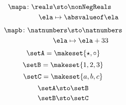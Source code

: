 {\begin{forslides}
        \begin{equation}
            \label{eq:quiz_inj_1}
            \begin{aligned}
                \mapa\colon \reals & \sto \nonNegReals \\
                \ela               & \mapsto \absvalueof \ela
            \end{aligned}
        \end{equation}
        \begin{equation}
            \label{eq:quiz_inj_2}
            \begin{aligned}
                \mapb\colon \natnumbers & \sto \natnumbers \\
                \ela                    & \mapsto \ela + 33
            \end{aligned}
        \end{equation}
        \begin{equation}
            \label{eq:quiz_isos_1}
            \setA=\makeset{{{\star}}, \circ}
        \end{equation}
        \begin{equation}
            \label{eq:quiz_isos_2}
            \setB=\makeset{1, 2, 3}
        \end{equation}
        \begin{equation}
            \label{eq:quiz_isos_3}
            \setC=\makeset{a, b, c}
        \end{equation}
        \begin{equation}
            \label{eq:quiz_isos_4}
            \setA \sto \setB
        \end{equation}
        \begin{equation}
            \label{eq:quiz_isos_5}
            \setB \sto \setC
        \end{equation}

    \end{forslides}
}
